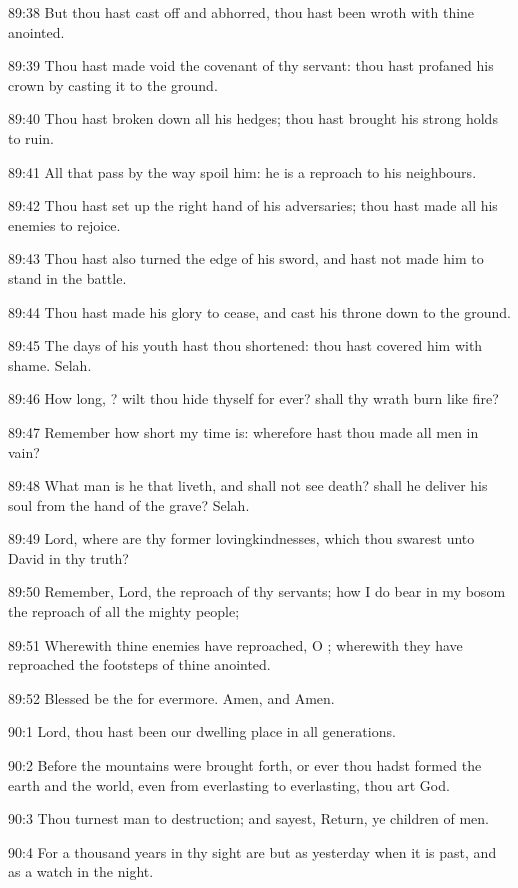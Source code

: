 89:38 But thou hast cast off and abhorred, thou hast been wroth with thine anointed.

89:39 Thou hast made void the covenant of thy servant: thou hast profaned his crown by casting it to the ground.

89:40 Thou hast broken down all his hedges; thou hast brought his strong holds to ruin.

89:41 All that pass by the way spoil him: he is a reproach to his neighbours.

89:42 Thou hast set up the right hand of his adversaries; thou hast made all his enemies to rejoice.

89:43 Thou hast also turned the edge of his sword, and hast not made him to stand in the battle.

89:44 Thou hast made his glory to cease, and cast his throne down to the ground.

89:45 The days of his youth hast thou shortened: thou hast covered him with shame. Selah.

89:46 How long, \LORD? wilt thou hide thyself for ever? shall thy wrath burn like fire?

89:47 Remember how short my time is: wherefore hast thou made all men in vain?

89:48 What man is he that liveth, and shall not see death? shall he deliver his soul from the hand of the grave? Selah.

89:49 Lord, where are thy former lovingkindnesses, which thou swarest unto David in thy truth?

89:50 Remember, Lord, the reproach of thy servants; how I do bear in my bosom the reproach of all the mighty people;

89:51 Wherewith thine enemies have reproached, O \LORD; wherewith they have reproached the footsteps of thine anointed.

89:52 Blessed be the \LORD for evermore. Amen, and Amen.



90:1 Lord, thou hast been our dwelling place in all generations.

90:2 Before the mountains were brought forth, or ever thou hadst formed the earth and the world, even from everlasting to everlasting, thou art God.

90:3 Thou turnest man to destruction; and sayest, Return, ye children of men.

90:4 For a thousand years in thy sight are but as yesterday when it is past, and as a watch in the night.


